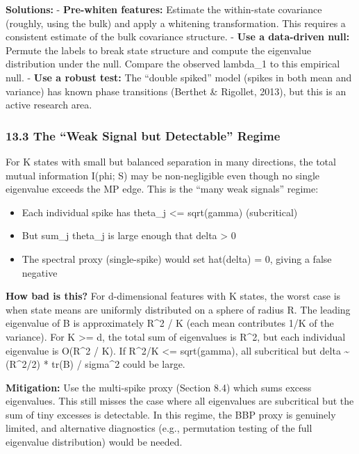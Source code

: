 \documentclass[
  12pt,
]{article}
\providecommand{\tightlist}{%
  \setlength{\itemsep}{0pt}\setlength{\parskip}{0pt}}
\begin{document}
\textbf{Solutions:} - \textbf{Pre-whiten features:} Estimate the
within-state covariance (roughly, using the bulk) and apply a whitening
transformation. This requires a consistent estimate of the bulk
covariance structure. - \textbf{Use a data-driven null:} Permute the
labels to break state structure and compute the eigenvalue distribution
under the null. Compare the observed lambda\_1 to this empirical null. -
\textbf{Use a robust test:} The ``double spiked'' model (spikes in both
mean and variance) has known phase transitions (Berthet \& Rigollet,
2013), but this is an active research area.

\subsubsection{13.3 The ``Weak Signal but Detectable''
Regime}\label{the-weak-signal-but-detectable-regime}

For K states with small but balanced separation in many directions, the
total mutual information I(phi; S) may be non-negligible even though no
single eigenvalue exceeds the MP edge. This is the ``many weak signals''
regime:

\begin{itemize}
\tightlist
\item
  Each individual spike has theta\_j \textless= sqrt(gamma)
  (subcritical)
\item
  But sum\_j theta\_j is large enough that delta \textgreater{} 0
\item
  The spectral proxy (single-spike) would set hat(delta) = 0, giving a
  false negative
\end{itemize}

\textbf{How bad is this?} For d-dimensional features with K states, the
worst case is when state means are uniformly distributed on a sphere of
radius R. The leading eigenvalue of B is approximately R\^{}2 / K (each
mean contributes 1/K of the variance). For K \textgreater= d, the total
sum of eigenvalues is R\^{}2, but each individual eigenvalue is O(R\^{}2
/ K). If R\^{}2/K \textless= sqrt(gamma), all subcritical but delta
\textasciitilde{} (R\^{}2/2) * tr(B) / sigma\^{}2 could be large.

\textbf{Mitigation:} Use the multi-spike proxy (Section 8.4) which sums
excess eigenvalues. This still misses the case where all eigenvalues are
subcritical but the sum of tiny excesses is detectable. In this regime,
the BBP proxy is genuinely limited, and alternative diagnostics (e.g.,
permutation testing of the full eigenvalue distribution) would be
needed.
\end{document}
